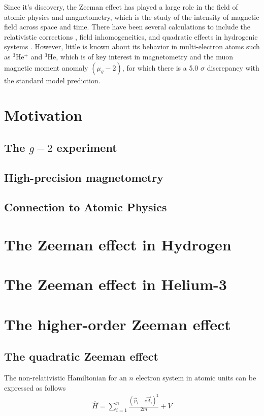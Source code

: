         Since it's discovery, the Zeeman effect has played a large role in the field of atomic physics and magnetometry, which is the study of the intensity of magnetic field across space and time. There have been several calculations to include the relativistic corrections \cite{2007Drake-Wu, Drake-Yan}, field inhomogeneities, and quadratic effects in hydrogenic systems \cite{Fontanari_Sadovskií_2015}. However, little is known about its behavior in multi-electron atoms such as $^3$He$^+$ and $^3$He, which is of key interest in magnetometry and the muon magnetic moment anomaly $(\mu_g - 2)$, for which there is a 5.0 $\sigma$ discrepancy \cite{aguillard2023measurement} with the standard model prediction.

    \section{Motivation}\label{sec:motivation}
        \subsection{The $g-2$ experiment}\label{sec:g-2}
        \subsection{High-precision magnetometry}\label{sec:High-Precision-magnetometry}
        \subsection{Connection to Atomic Physics}\label{sec:Connection_To_AMO}
    \section{The Zeeman effect in Hydrogen}\label{sec:Ordinary_Zeeman}
    \section{The Zeeman effect in Helium-3}\label{sec:Ordinary_Zeeman_He3}
    \section{The higher-order Zeeman effect}\label{sec:Higher_Zeeman}
        \subsection{The quadratic Zeeman effect}\label{sec:quadratic_zeeman}
            The non-relativistic Hamiltonian for an $n$ electron system in atomic units can be expressed as follows
            \begin{align}
                \hat{H} = \sum_{i = 1}^n \frac{\left(\vec{p}_i - e\vec{A}_i \right)^2}{2m} + V
            \end{align}

